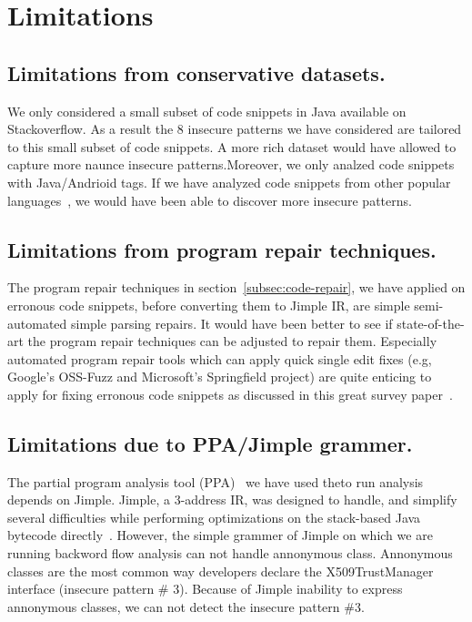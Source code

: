 \section{Limitations}
\label{sec:limitations}
\subsection{Limitations from conservative datasets.} We only considered a small subset of code snippets in Java available on Stackoverflow. 
As a result the 8 insecure patterns we have considered are tailored to this small subset of code snippets. 
A more rich dataset would have allowed to capture more naunce insecure patterns.Moreover, we only analzed code snippets with Java/Andrioid tags.
If we have analyzed code snippets from other popular languages~\cite{stackoverflow-survey}, we would have been able to
discover more insecure patterns.   


\subsection{Limitations from program repair techniques.} The program repair techniques in section~\ref{subsec:code-repair}, we have applied on erronous code snippets, 
before converting them to Jimple IR, are simple semi-automated simple parsing  repairs. It would have been better to see if state-of-the-art  
the program repair techniques can be adjusted to repair them. Especially automated program repair tools which can apply quick single edit fixes (e.g, Google's OSS-Fuzz and Microsoft's Springfield project) are quite enticing to apply for fixing erronous code snippets as discussed in this great survey paper~\cite{automated-program-repair}.



\noindent
\label{limitatons:jimple} 
\subsection{Limitations due to PPA/Jimple grammer.} The partial program analysis tool (PPA)~\cite{dagenais2008enabling} we have used theto run 
analysis depends on Jimple.
Jimple, a 3-address IR, was designed to handle, and simplify several
difficulties while performing optimizations on the stack-based Java bytecode directly~\cite{vallee1998jimple}. However, 
the simple grammer of Jimple on which we are running backword flow analysis can not handle annonymous class. 
Annonymous classes are the most common way developers declare the X509TrustManager interface (insecure pattern \# 3). Because of
Jimple inability to express annonymous classes, we can not detect the insecure pattern \#3.

